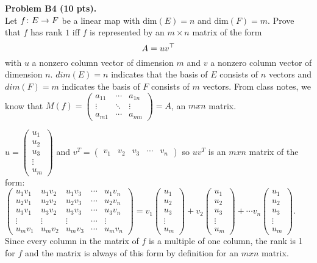 \documentclass[12pt]{article}
\begin{document}
\vspace {0.25cm}\noindent
{\bf Problem B4 (10 pts).} \\
Let $f\colon E\rightarrow F$ be a linear map 
with $\mathrm{dim}(E) = n$ and $\mathrm{dim}(F)  = m$.
Prove that $f$ has rank $1$ iff $f$ is represented by an
$m\times n$ matrix of the form
\[
A = uv^{\top}
\]
with $u$ a nonzero column vector of dimension $m$ and $v$ a 
nonzero column vector  of dimension $n$.
$dim(E)=n$ indicates that the basis of $E$ consists of $n$ vectors
and $dim(F)=m$ indicates the basis of $F$ consists of $m$ vectors.
From class notes, we know that $M(f)=\begin{pmatrix}a_{11} & \cdots & a_{1n}\\
\vdots & \ddots & \vdots\\
a_{m1} & \cdots & a_{mn}
\end{pmatrix}=A$, an $mxn$ matrix.

$u=\begin{pmatrix}u_{1}\\
u_{2}\\
u_{3}\\
\vdots\\
u_{m}
\end{pmatrix}$ and $v^{T}=\begin{pmatrix}v_{1} & v_{2} & v_{3} & \cdots & v_{n}\end{pmatrix}$
so $uv^{T}$ is an $mxn$ matrix of the form: $\begin{pmatrix}u_{1}v_{1} & u_{1}v_{2} & u_{1}v_{3} & \cdots & u_{1}v_{n}\\
u_{2}v_{1} & u_{2}v_{2} & u_{2}v_{3} & \cdots & u_{2}v_{n}\\
u_{3}v_{1} & u_{3}v_{2} & u_{3}v_{3} & \cdots & u_{3}v_{n}\\
\vdots & \vdots & \vdots & \cdots & \vdots\\
u_{m}v_{1} & u_{m}v_{2} & u_{m}v_{3} & \cdots & u_{m}v_{n}
\end{pmatrix}=v_{1}\begin{pmatrix}u_{1}\\
u_{2}\\
u_{3}\\
\vdots\\
u_{m}
\end{pmatrix}+v_{2}\begin{pmatrix}u_{1}\\
u_{2}\\
u_{3}\\
\vdots\\
u_{m}
\end{pmatrix}+\cdots v_{n}\begin{pmatrix}u_{1}\\
u_{2}\\
u_{3}\\
\vdots\\
u_{m}
\end{pmatrix}$. Since every column in the matrix of $f$ is a multiple of one column,
the rank is 1 for $f$ and the matrix is always of this form by definition
for an $mxn$ matrix.
\end{document}
